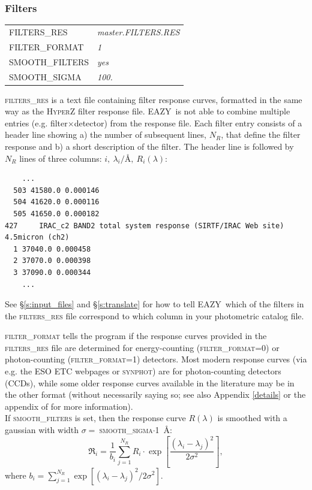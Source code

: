 \documentclass[11pt]{article}
\newcommand{\eazy}{\textsc{EAZY}}
\begin{document}
\subsubsection{Filters}
\begin{tabular}{ll}
 \textsc{FILTERS\_RES} & \textsl{  master.FILTERS.RES} \\
 \textsc{FILTER\_FORMAT} & \textsl{         1} \\
 \textsc{SMOOTH\_FILTERS} & \textsl{        yes} \\
 \textsc{SMOOTH\_SIGMA} & \textsl{        100.}
\end{tabular}

\vspace*{0.5cm}\textsc{filters\_res} is a text file containing filter response
curves, formatted in the same way as the \textsc{HyperZ} filter response file. 
\eazy\ is not able to combine multiple entries (e.g. filter$\times$detector)
from the response file.  Each filter entry consists of a header line showing a)
the number of subsequent lines, $N_R$, that define the filter response and b) a
short description of the filter.  The header line is followed by $N_R$ lines of
three columns: $i,\ \lambda_i/$\AA$,\ R_i(\lambda)$:

\begin{verbatim}
    ...
  503 41580.0 0.000146
  504 41620.0 0.000116
  505 41650.0 0.000182
427     IRAC_c2 BAND2 total system response (SIRTF/IRAC Web site) 4.5micron (ch2)
  1 37040.0 0.000458
  2 37070.0 0.000398
  3 37090.0 0.000344
    ...
\end{verbatim}

\noindent See \S\ref{s:input_files} and \S\ref{s:translate} for how to tell
\eazy\ which of the filters in the \textsc{filters\_res} file correspond to
which column in your photometric catalog file.

\textsc{filter\_format} tells the program if the response curves provided in
the \textsc{filters\_res} file are determined for energy-counting
(\textsc{filter\_format}=0) or photon-counting (\textsc{filter\_format}=1)
detectors.  Most modern response curves (via e.g. the ESO ETC webpages or 
\textsc{synphot}) are for photon-counting detectors (CCDs), while some older
response curves available in the literature may be in the other format (without
necessarily saying so; see also Appendix \ref{details} or the appendix of
\cite{maiz} for more information).\\

If \textsc{smooth\_filters} is set, then the response curve $R(\lambda)$ is
smoothed with a gaussian with width $\sigma =\ $\textsc{smooth\_sigma}$\cdot$1\
\AA:
\begin{equation}
\Re_i = \frac{1}{b_i}\sum_{j=1}^{N_R} R_i \cdot \exp\left[\frac{\left(\lambda_i-\lambda_j\right)^2}{2\sigma^2}\right] \label{smooth_filters},
\end{equation}
where $b_i = \sum_{j=1}^{N_R} \exp[(\lambda_i-\lambda_j)^2/2\sigma^2]$.
\end{document}
